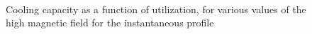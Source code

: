\documentclass[referee]{svjour3}
\begin{document}
\begin{figure}[!ht]
  \centering
{}
\,
  \caption{Cooling capacity as a function of utilization, for various values of the high magnetic field  for the instantaneous profile}
  \label{fig:qc_phi_inst}
\end{figure}
\end{document}
